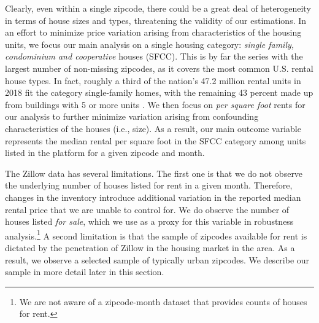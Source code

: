 Clearly, even within a single zipcode, there could be a great deal of heterogeneity in 
terms of house sizes and types, threatening the validity of our estimations. In an effort 
to minimize price variation arising from characteristics of the housing units, we focus 
our main analysis on a single housing category: \textit{single family, condominium and 
cooperative} houses (SFCC). This is by far the series with the largest number of 
non-missing zipcodes, as it covers the most common U.S. rental house types. In fact, 
roughly a third of the nation's 47.2 million rental units in 2018 fit the category 
single-family homes, with the remaining 43 percent made up from buildings with 5 or more 
units \parencite{fernald2020americas}. We then focus on \textit{per square foot} rents 
for our analysis to further minimize variation arising from confounding characteristics
of the houses (i.e., size). As a result, our main outcome variable represents the median 
rental per square foot in the SFCC category among units listed in the platform for a 
given zipcode and month. 

The Zillow data has several limitations. The first one is that we do not observe the 
underlying number of houses listed for rent in a given month. Therefore, changes in the 
inventory introduce additional variation in the reported median rental price that we 
are unable to control for. We do observe the number of houses listed \textit{for sale}, 
which we use as a proxy for this variable in robustness analysis.\footnote{We are not 
	aware of a zipcode-month dataset that provides counts of houses for rent.}
A second limitation is that the sample of zipcodes 
available for rent is dictated by the penetration of Zillow in the housing market in the 
area. As a result, we observe a selected sample of typically urban zipcodes. We describe 
our sample in more detail later in this section.

